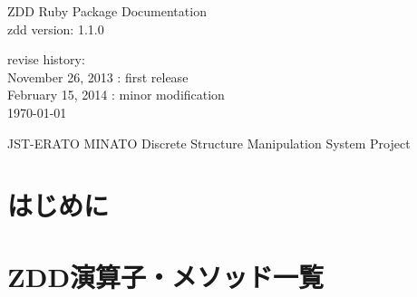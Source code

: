 \documentclass[a4paper]{jsbook}
\begin{document}
\begin{titlepage}
\begin{center}
{\huge ZDD Ruby Package Documentation}\\
\vspace{10truept}
{\normalsize zdd version: 1.1.0}\\
\vspace{1cm}

revise history:\\
November 26, 2013 : first release\\
February 15, 2014 : minor modification\\
\vspace{18cm}
{\small \today}

{\small JST-ERATO MINATO Discrete Structure Manipulation System Project}
\end{center}
\end{titlepage}

\setcounter{tocdepth}{1}
\tableofcontents

\chapter{はじめに}





\chapter{ZDD演算子・メソッド一覧}




























































\fi
\end{document}
